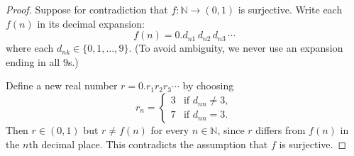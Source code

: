 \begin{proof}
Suppose for contradiction that $f \colon \mathbb{N} \to (0,1)$ is surjective. Write each $f(n)$ in its decimal expansion:
\[
    f(n) = 0.d_{n1}\, d_{n2}\, d_{n3}\, \cdots
\]
where each $d_{nk} \in \{0, 1, \ldots, 9\}$. (To avoid ambiguity, we never use an expansion ending in all $9$s.)

Define a new real number $r = 0.r_1 r_2 r_3 \cdots$ by choosing
\[
    r_n = \begin{cases} 3 & \text{if } d_{nn} \neq 3, \\ 7 & \text{if } d_{nn} = 3. \end{cases}
\]
Then $r \in (0,1)$ but $r \neq f(n)$ for every $n \in \mathbb{N}$, since $r$ differs from $f(n)$ in the $n$th decimal place. This contradicts the assumption that $f$ is surjective.
\end{proof}


